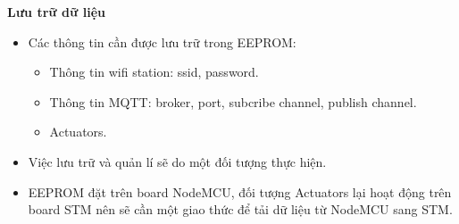 \documentclass[a4paper,12pt,oneside]{article}
\begin{document}
\noindent	\textbf{Lưu trữ dữ liệu}
	\begin{itemize}
	\item	Các thông tin cần được lưu trữ trong EEPROM:
		\begin{itemize}
		\item	Thông tin wifi station: ssid, password.
		\item	Thông tin MQTT: broker, port, subcribe channel, publish channel.
		\item	Actuators.
		\end{itemize}
	\item	Việc lưu trữ và quản lí sẽ do một đối tượng thực hiện.
	
	\item	EEPROM đặt trên board NodeMCU, đối tượng Actuators lại hoạt động trên board STM nên sẽ cần một giao thức để tải dữ liệu từ NodeMCU sang STM. 

	\end{itemize}
\end{document}
